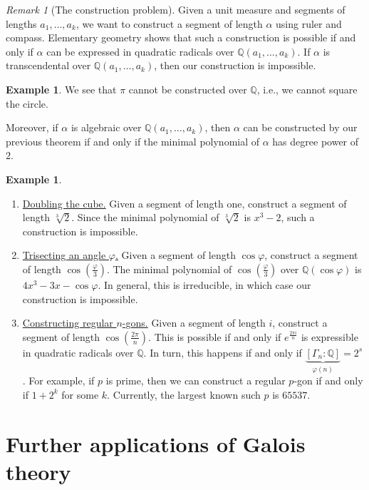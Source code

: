 \documentclass[10pt,letterpaper,cm]{nupset}
\theoremstyle{definition}
\newtheorem{exmp}[definition]{Example}
\theoremstyle{theorem}
\theoremstyle{remark}
\newtheorem{remark}[definition]{Remark}
\newcommand{\Q}{\mathbb Q}
\newcommand{\1}{\mathbf{1}}
\newcommand{\0}{\vec 0}
\begin{document}
\begin{remark}[The construction problem]
Given a unit measure and segments of lengths $a_1, \ldots, a_k$, we want to construct a segment of length $\alpha$ using ruler and compass. Elementary geometry shows that such a construction is possible if and only if $\alpha$ can be expressed in quadratic radicals over $\Q(a_1, \ldots, a_k)$. 
If $\alpha$ is transcendental over $\Q(a_1, \ldots, a_k)$, then our construction is impossible. 
\begin{exmp}
We see that $\pi$ cannot be constructed over $\Q$, i.e., we cannot square the circle. 
\end{exmp} 
Moreover, if $\alpha$ is algebraic over $\Q(a_1, \ldots, a_k)$, then $\alpha$ can be constructed by our previous theorem if and only if the minimal polynomial of $\alpha$ has degree power of $2$.
\begin{exmp} $ $
\begin{enumerate}[label=(\alph*)]
\item \underline{Doubling the cube.} Given a segment of length one, construct a segment of length $\sqrt[3]{2}$. Since the minimal polynomial of $\sqrt[3]{2}$ is $x^3-2$, such a construction is impossible.
\item \underline{Trisecting an angle $\varphi$.} Given a segment of length $\cos{\varphi}$, construct a segment of length $\cos\left(\frac{\varphi}{3}\right)$. The minimal polynomial of $\cos\left(\frac{\varphi}{3}\right)$ over $\Q(\cos{\varphi})$ is $4x^3 - 3x - \cos{\varphi}$. In general, this is irreducible, in which case our construction is impossible. 
\item \underline{Constructing regular $n$-gons.} Given a segment of length $i$, construct a segment of length $\cos\left(\frac{2\pi}{n}\right)$. This is possible if and only if $e^{\frac{2\pi i}{n}}$ is expressible in quadratic radicals over $\Q$. In turn, this happens if and only if $\underbrace{[\Gamma_n : \Q]}_{\varphi(n)} = 2^s$. For example, if $p$ is prime, then we can construct a regular $p$-gon if and only if $1+2^k$ for some $k$. Currently, the largest known such $p$ is $\num{65537}$.
\end{enumerate}
\end{exmp}
\end{remark}

\section{Further applications of Galois theory}
\end{document}
